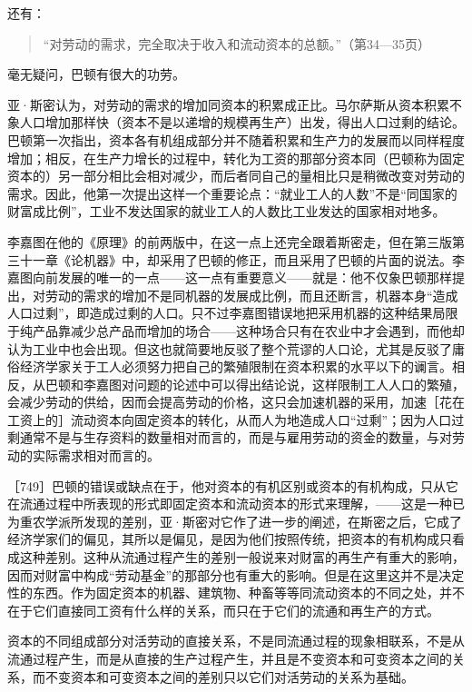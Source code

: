 还有：

\begin{quote}{“对劳动的需求，完全取决于收入和流动资本的总额。”（第34—35页）}\end{quote}

毫无疑问，巴顿有很大的功劳。

亚·斯密认为，对劳动的需求的增加同资本的积累成正比。马尔萨斯从资本积累不象人口增加那样快（资本不是以递增的规模再生产）出发，得出人口过剩的结论。巴顿第一次指出，资本各有机组成部分并不随着积累和生产力的发展而以同样程度增加；相反，在生产力增长的过程中，转化为工资的那部分资本同（巴顿称为固定资本的）另一部分相比会相对减少，而后者同自己的量相比只是稍微改变对劳动的需求。因此，他第一次提出这样一个重要论点：“就业工人的人数”不是“同国家的财富成比例”，工业不发达国家的就业工人的人数比工业发达的国家相对地多。

李嘉图在他的《原理》的前两版中，在这一点上还完全跟着斯密走，但在第三版第三十一章《论机器》中，却采用了巴顿的修正，而且采用了巴顿的片面的说法。李嘉图向前发展的唯一的一点——这一点有重要意义——就是：他不仅象巴顿那样提出，对劳动的需求的增加不是同机器的发展成比例，而且还断言，机器本身“造成人口过剩”，即造成过剩的人口。只不过李嘉图错误地把采用机器的这种结果局限于纯产品靠减少总产品而增加的场合——这种场合只有在农业中才会遇到，而他却认为工业中也会出现。但这也就简要地反驳了整个荒谬的人口论，尤其是反驳了庸俗经济学家关于工人必须努力把自己的繁殖限制在资本积累的水平以下的谰言。相反，从巴顿和李嘉图对问题的论述中可以得出结论说，这样限制工人人口的繁殖，会减少劳动的供给，因而会提高劳动的价格，这只会加速机器的采用，加速［花在工资上的］流动资本向固定资本的转化，从而人为地造成人口“过剩”；因为人口过剩通常不是与生存资料的数量相对而言的，而是与雇用劳动的资金的数量，与对劳动的实际需求相对而言的。

［749］巴顿的错误或缺点在于，他对资本的有机区别或资本的有机构成，只从它在流通过程中所表现的形式即固定资本和流动资本的形式来理解，——这是一种已为重农学派所发现的差别，亚·斯密对它作了进一步的阐述，在斯密之后，它成了经济学家们的偏见，其所以是偏见，是因为他们按照传统，把资本的有机构成只看成这种差别。这种从流通过程产生的差别一般说来对财富的再生产有重大的影响，因而对财富中构成“劳动基金”的那部分也有重大的影响。但是在这里这并不是决定性的东西。作为固定资本的机器、建筑物、种畜等等同流动资本的不同之处，并不在于它们直接同工资有什么样的关系，而只在于它们的流通和再生产的方式。

资本的不同组成部分对活劳动的直接关系，不是同流通过程的现象相联系，不是从流通过程产生，而是从直接的生产过程产生，并且是不变资本和可变资本之间的关系，而不变资本和可变资本之间的差别只以它们对活劳动的关系为基础。

